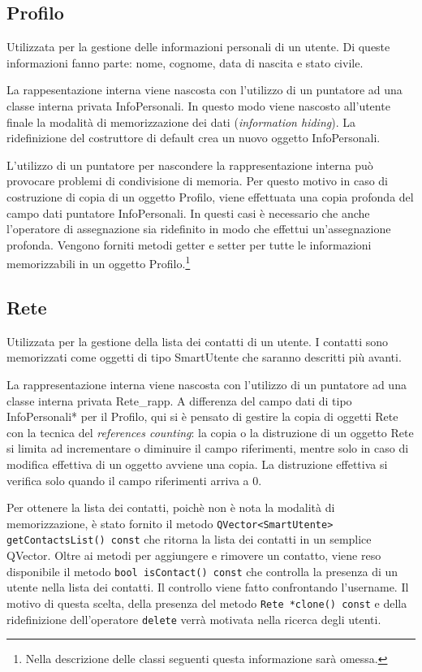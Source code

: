 \documentclass[a4paper,openany]{article}
\begin{document}
\subsection*{Profilo}
Utilizzata per la gestione delle informazioni personali di un utente. Di queste informazioni fanno parte: nome, cognome, data di nascita e stato civile. 

La rappesentazione interna viene nascosta con l'utilizzo di un puntatore ad una classe interna privata InfoPersonali. In questo modo viene nascosto all'utente finale la modalità di memorizzazione dei dati (\textit{information hiding}). La ridefinizione del costruttore di default crea un nuovo oggetto InfoPersonali. 

L'utilizzo di un puntatore per nascondere la rappresentazione interna può provocare problemi di condivisione di memoria. Per questo motivo in caso di costruzione di copia di un oggetto Profilo, viene effettuata una copia profonda del campo dati puntatore InfoPersonali. In questi casi è necessario che anche l'operatore di assegnazione sia ridefinito in modo che effettui un'assegnazione profonda. Vengono forniti metodi getter e setter per tutte le informazioni memorizzabili in un oggetto Profilo.\footnote{Nella descrizione delle classi seguenti questa informazione sarà omessa.}

\subsection*{Rete}
Utilizzata per la gestione della lista dei contatti di un utente. I contatti sono memorizzati come oggetti di tipo SmartUtente che saranno descritti più avanti.

La rappresentazione interna viene nascosta con l'utilizzo di un puntatore ad una classe interna privata Rete\_rapp. A differenza del campo dati di tipo InfoPersonali* per il Profilo, qui si è pensato di gestire la copia di oggetti Rete con la tecnica del \textit{references counting}: la copia o la distruzione di un oggetto Rete si limita ad incrementare o diminuire il campo riferimenti, mentre solo in caso di modifica effettiva di un oggetto avviene una copia. La distruzione effettiva si verifica solo quando il campo riferimenti arriva a 0.

Per ottenere la lista dei contatti, poichè non è nota la modalità di memorizzazione, è stato fornito il metodo \texttt{QVector<SmartUtente> getContactsList() const} che ritorna la lista dei contatti in un semplice QVector. Oltre ai metodi per aggiungere e rimovere un contatto, viene reso disponibile il metodo \texttt{bool isContact() const} che controlla la presenza di un utente nella lista dei contatti. Il controllo viene fatto confrontando l'username. Il motivo di questa scelta, della presenza del metodo \texttt{Rete *clone() const} e della ridefinizione dell'operatore \texttt{delete} verrà motivata nella ricerca degli utenti.
\end{document}
